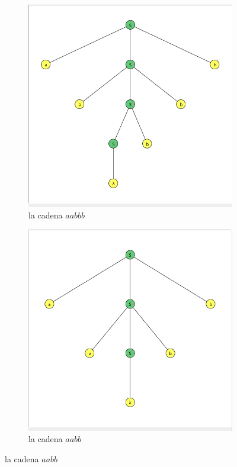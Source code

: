 \documentclass{article}
\begin{document}
\begin{flushleft}
\begin{enumerate}
\begin{figure}[h]
\begin{subfigure}[b]{0.45\textwidth}
                        \includegraphics[width=\textwidth]{./Imagenes/grafoaabbb.png}
                        \caption{la cadena $aabbb$}
                        \label{fig:label3}
                    \end{subfigure}
                    \hfill
                    \begin{subfigure}[b]{0.45\textwidth}
                        \centering
                        \includegraphics[width=\textwidth]{./Imagenes/grafoaabb.png}
                        \caption{la cadena $aabb$}
                        \label{fig:label4}
                    \end{subfigure}
                    \label{fig:matrix1}
                \end{figure}


\end{enumerate}
\end{flushleft}
\end{document}
